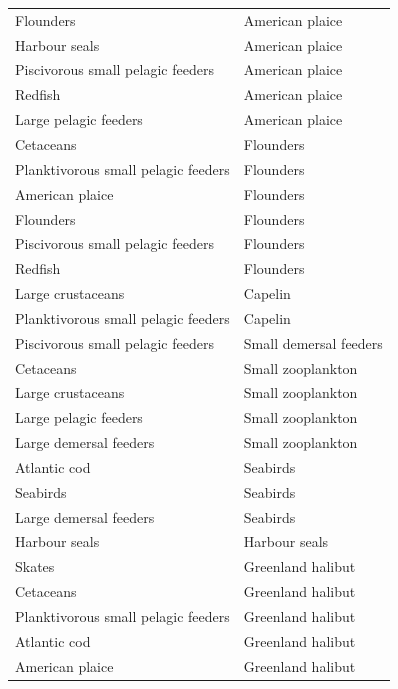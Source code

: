\begin{singlespace}
\begin{longtable}{ p{} p{} }
    Flounders                           & American plaice   \\
    Harbour seals                       & American plaice   \\
    Piscivorous small pelagic feeders   & American plaice   \\
    Redfish                             & American plaice   \\
    Large pelagic feeders               & American plaice   \\
    Cetaceans                           & Flounders \\
    Planktivorous small pelagic feeders & Flounders \\
    American plaice                     & Flounders \\
    Flounders                           & Flounders \\
    Piscivorous small pelagic feeders   & Flounders \\
    Redfish                             & Flounders \\
    Large crustaceans                   & Capelin   \\
    Planktivorous small pelagic feeders & Capelin   \\
    Piscivorous small pelagic feeders   & Small demersal feeders    \\
    Cetaceans                           & Small zooplankton \\
    Large crustaceans                   & Small zooplankton \\
    Large pelagic feeders               & Small zooplankton \\
    Large demersal feeders              & Small zooplankton \\
    Atlantic cod                        & Seabirds  \\
    Seabirds                            & Seabirds  \\
    Large demersal feeders              & Seabirds  \\
    Harbour seals                       & Harbour seals \\
    Skates                              & Greenland halibut \\
    Cetaceans                           & Greenland halibut \\
    Planktivorous small pelagic feeders & Greenland halibut \\
    Atlantic cod                        & Greenland halibut \\
    American plaice                     & Greenland halibut \\

\end{longtable}
\end{singlespace}
